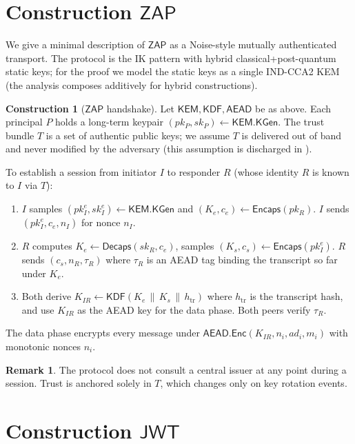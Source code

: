 \documentclass[11pt,a4paper]{article}
\theoremstyle{plain}
\theoremstyle{definition}
\newtheorem{remark}[theorem]{Remark}
\newtheorem{construction}[theorem]{Construction}
\newcommand{\KEM}{\mathsf{KEM}}
\newcommand{\KDF}{\mathsf{KDF}}
\newcommand{\AEAD}{\mathsf{AEAD}}
\newcommand{\JWT}{\mathsf{JWT}}
\newcommand{\ZAP}{\mathsf{ZAP}}
\newcommand{\KeyGen}{\mathsf{KGen}}
\newcommand{\Encaps}{\mathsf{Encaps}}
\newcommand{\Decaps}{\mathsf{Decaps}}
\newcommand{\Enc}{\mathsf{Enc}}
\begin{document}
\section{Construction $\ZAP$}
\label{sec:zapcon}

We give a minimal description of $\ZAP$ as a Noise-style mutually
authenticated transport. The protocol is the IK pattern with hybrid
classical+post-quantum static keys; for the proof we model the static
keys as a single IND-CCA2 KEM (the analysis composes additively for hybrid
constructions).

\begin{construction}[$\ZAP$ handshake]
\label{con:zap}
Let $\KEM, \KDF, \AEAD$ be as above. Each principal $P$ holds a
long-term keypair $(pk_P, sk_P) \gets \KEM.\KeyGen$. The trust bundle
$T$ is a set of authentic public keys; we assume $T$ is delivered out of
band and never modified by the adversary (this assumption is discharged
in ).

To establish a session from initiator $I$ to responder $R$ (whose
identity $R$ is known to $I$ via $T$):
\begin{enumerate}[itemsep=2pt,topsep=2pt]
  \item $I$ samples $(pk_I^e, sk_I^e) \gets \KEM.\KeyGen$ and
        $(K_e, c_e) \gets \Encaps(pk_R)$. $I$ sends $(pk_I^e, c_e, n_I)$
        for nonce $n_I$.
  \item $R$ computes $K_e \gets \Decaps(sk_R, c_e)$, samples
        $(K_s, c_s) \gets \Encaps(pk_I^e)$. $R$ sends $(c_s, n_R, \tau_R)$
        where $\tau_R$ is an AEAD tag binding the transcript so far under
        $K_e$.
  \item Both derive
        $K_{IR} \gets \KDF(K_e \,\|\, K_s \,\|\, h_{\text{tr}})$ where
        $h_{\text{tr}}$ is the transcript hash, and use $K_{IR}$ as the
        AEAD key for the data phase. Both peers verify $\tau_R$.
\end{enumerate}
The data phase encrypts every message under $\AEAD.\Enc(K_{IR}, n_i, ad_i, m_i)$ with monotonic nonces $n_i$.
\end{construction}

\begin{remark}
The protocol does not consult a central issuer at any point during a
session. Trust is anchored solely in $T$, which changes only on key
rotation events.
\end{remark}

\section{Construction $\JWT$}
\label{sec:jwtcon}
\end{document}
